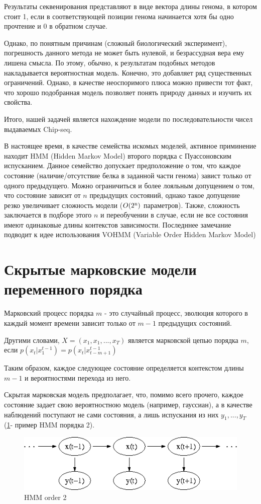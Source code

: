 \documentclass[10pt,a4paper]{article}
\begin{document}
Результаты секвенирования представляют в виде вектора длины генома, в котором
стоит 1, если в соответствующей позиции генома начинается хотя бы одно прочтение
и 0 в обратном случае.

Однако, по понятным причинам (сложный биологический эксперимент), погрешность данного метода не может быть нулевой, и безрассудная вера ему лишена смысла. По этому, обычно, к результатам подобных методов накладывается вероятностная модель. Конечно, это добавляет ряд существенных ограничений. Однако, в качестве неоспоримого плюса можно привести тот факт, что хорошо подобранная модель позволяет понять природу данных и изучить их свойства.

Итого, нашей задачей является нахождение модели по последовательности чисел выдаваемых Chip-seq.

В настоящее время, в качестве семейства искомых моделей, активное приминение находит HMM (Hidden Markov Model)\cite{Rabiner1989} второго порядка с Пуассоновским испусканием.
Данное семейство допускает предположение о том, что каждое состояние (наличие/отсутствие белка в заданной части генома) завист только от одного предыдущего.
Можно ограничиться и более лояльным допущением о том, что состояние зависит от $n$ предыдущих состояний, однако такое допущение резко увеличивает сложность модели ($O(2\textsuperscript{n})$ параметров). Также, сложность заключается в подборе этого $n$ и переобучении в случае, если не все состояния имеют одинаковые длины контекстов зависимости.
Последннее замечание подводит к идее использования VOHMM (Variable Order Hidden Markov Model)\cite{Wang2006}


\section{Скрытые марковские модели переменного порядка}

Марковский процесс порядка $ m $ - это случайный процесс, эволюция которого в каждый момент времени зависит только от $ m-1 $ предыдущих состояний.

Другими словами, $ X = (x_{1}, x_{1}, ..., x_{T}) $ является марковской цепью порядка $ m $,
если $ p(x_{t}|x_{1}^{t-1}) = p(x_{t}|x_{t-m+1}^{t-1})$

Таким образом, каждое следующее состояние определяется контекстом длины $ m-1 $ и вероятностями перехода из него.

Скрытая марковская модель предполагает, что, помимо всего прочего, каждое состояние задает свою вероятностною модель (например, гауссиан), а в качестве наблюдений поступают не сами состояния, а лишь испускания из них $y_{1},...,y_{T}$ (\ref{ris:image}- пример HMM порядка 2).
\begin{figure}[hbtp]
\includegraphics[scale=0.4]{Hmm_temporal_bayesian_net.png}
\centering
\caption{HMM order 2}
\label{ris:image}
\end{figure}
\end{document}
